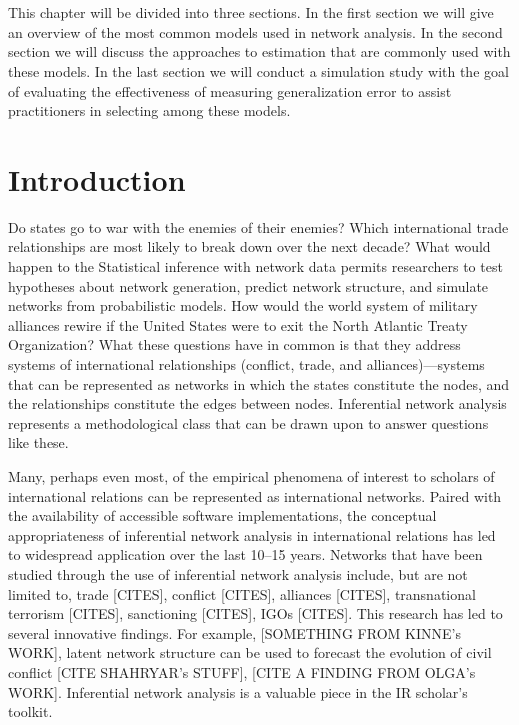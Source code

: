 \documentclass[fleqn,12pt]{wlscirep}
\begin{document}
\\~\\
 This chapter will be divided into three sections. In the first section we will give an overview of the most common models used in network analysis. In the second section we will discuss the approaches to estimation that are commonly used with these models. In the last section we will conduct a simulation study with the goal of evaluating the effectiveness of measuring generalization error to assist practitioners in selecting among these models.

\section{Introduction}

Do states go to war with the enemies of their enemies? Which international trade relationships are most likely to break down over the next decade? What would happen to the  Statistical inference with network data permits researchers to test hypotheses about network generation, predict network structure, and simulate networks from probabilistic models. How would the world system of military alliances rewire if the United States were to exit the North Atlantic Treaty Organization? What these questions have in common is that they  address systems of international relationships (conflict, trade, and alliances)---systems that can be represented as networks in which the states constitute the nodes, and the relationships constitute the edges between nodes. Inferential network analysis represents a methodological class that can be drawn upon to answer questions like these. 

Many, perhaps even most, of the empirical phenomena of interest to scholars of international relations can be represented as international networks. Paired with the availability of accessible software implementations, the conceptual appropriateness of inferential network analysis in international relations has led to widespread application over the last 10--15 years. Networks that have been studied through the use of inferential network analysis include, but are not limited to, trade [CITES], conflict [CITES], alliances [CITES], transnational terrorism [CITES], sanctioning [CITES], IGOs [CITES]. This research has led to several innovative findings. For example, [SOMETHING FROM KINNE's WORK], latent network structure can be used to forecast the evolution of civil conflict [CITE SHAHRYAR's STUFF], [CITE A FINDING FROM OLGA's WORK]. Inferential network analysis is a valuable piece in the IR scholar's toolkit.
 
\end{document}
